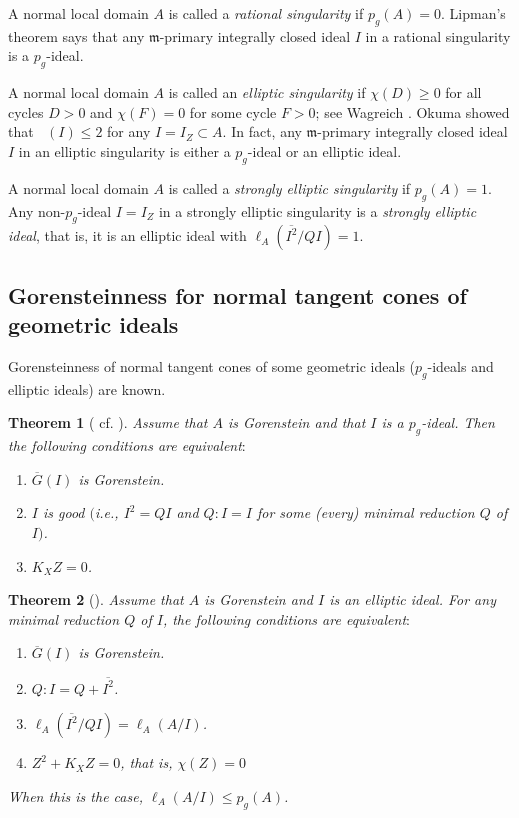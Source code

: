 \documentclass[12pt]{amsart}
\newtheorem{thm}{Theorem}[section]
\theoremstyle{definition}
\theoremstyle{remark}
\numberwithin{equation}{section}
\DeclareMathOperator{\br}{\bar r}
\newcommand{\m}{\mathfrak m}
\renewcommand{\:}{\colon}
\begin{document}
\par \vspace{2mm}
A normal local domain $A$ is called a \textit{rational singularity} if 
$p_g(A)=0$. 
Lipman's theorem says that any $\m$-primary integrally closed ideal 
$I$ in a rational singularity is a $p_g$-ideal. 

\par  \vspace{2mm}
A normal local domain $A$ is called an \textit{elliptic singularity} 
if $\chi(D)\ge 0$ for all cycles $D > 0$ and $\chi(F)=0$ for some cycle $F > 0$; see Wagreich \cite[pp.428]{Wa}. 
Okuma \cite{Ok} showed that $\br(I) \le 2$ for any $I=I_Z \subset A$. 
In fact, any $\m$-primary integrally closed ideal $I$ in an 
elliptic singularity is either a $p_g$-ideal or an elliptic ideal. 

\par  \vspace{2mm}
A normal local domain $A$ is called a \textit{strongly elliptic singularity} 
if $p_g(A)=1$. 
Any non-$p_g$-ideal $I=I_Z$ in a strongly elliptic singularity is a \textit{strongly elliptic ideal}, 
that is, it is an elliptic ideal with $\ell_A(\overline{I^2}/QI)=1$. 


\subsection{Gorensteinness for normal tangent cones of geometric ideals}
\par  \vspace{2mm}
Gorensteinness of normal tangent cones of some geometric ideals ($p_g$-ideals and elliptic ideals) 
are known. 

\begin{thm}[  \textrm{cf. \cite{OWY6}}]  
\label{pgCM}
Assume that $A$ is Gorenstein and that $I$ is a $p_g$-ideal. 
Then the following conditions are equivalent$:$
\begin{enumerate}
\item $\overline{G}(I)$ is Gorenstein.
\item  $I$ is \emph{good} 
$($i.e., $I^2=QI$ and $Q:I=I$ for some (every) minimal reduction $Q$ of $I$$)$. 
\item $K_XZ=0$. 
\end{enumerate}
\end{thm}

\begin{thm}[\textrm{\cite{OWY6}}] \label{EllipGor}
Assume that $A$ is Gorenstein and $I$ is an elliptic ideal. 
For any minimal reduction $Q$ of $I$,  
the following conditions are equivalent$:$
\begin{enumerate}
\item $\overline{G}(I)$ is Gorenstein. 
\item $Q \colon I=Q+\overline{I^2}$. 
\item $\ell_A(\overline{I^2}/QI)=\ell_A(A/I)$. 
\item $Z^2+K_XZ=0$, that is, $\chi(Z)=0$
\end{enumerate}
When this is the case, $\ell_A(A/I) \le p_g(A)$.
\end{thm}
\end{document}
